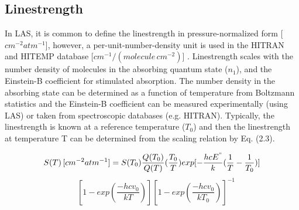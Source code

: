

\subsection{Linestrength}
In LAS, it is common to define the linestrength in pressure-normalized form [$cm^{-2}atm^{-1}$], however, a per-unit-number-density unit is used in the HITRAN and HITEMP database [$cm^{-1}/(molecule \, cm^{-2})$] \cite{2013JQSRT.130....4R}. Linestrength scales with the number density of molecules in the absorbing quantum state ($n_1$), and the Einstein-B coefficient for stimulated absorption. The number density in the absorbing state can be determined as a function of temperature from Boltzmann statistics and the Einstein-B coefficient can be measured experimentally (using LAS) or taken from spectroscopic databases (e.g. HITRAN). Typically, the linestrength is known at a reference temperature ($T_0$) and then the linestrength at temperature T can be determined from the scaling relation by Eq. (2.3). 

\begin{equation*}
S(T)\,[cm^{-2}atm^{-1}]=S(T_0)\frac{Q(T_0)}{Q(T)}(\frac{T_0}{T})exp[-\frac{hcE^"}{k}(\frac{1}{T}-\frac{1}{T_0})] 
\end{equation*}
\begin{equation}\label{}
\quad[1-exp(\frac{-hcv_{0}}{kT})][1-exp(\frac{-hcv_{0}}{kT_0})]^{-1}  
\end{equation}

